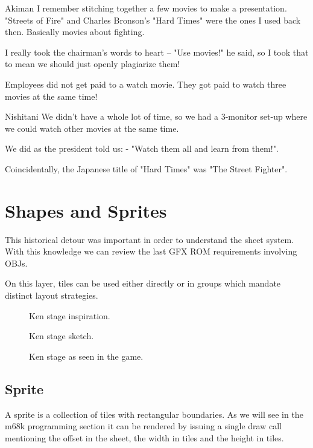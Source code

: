 \begin{q}{Akiman\cite{ffdevinterview}}
I remember stitching together a few movies to make a presentation. "Streets of Fire" and Charles Bronson’s "Hard Times" were the ones I used back then. Basically movies about fighting. 

I really took the chairman’s words to heart – "Use movies!" he said, so I took that to mean we should just openly plagiarize them!
\end{q}

Employees did not get paid to a watch movie. They got paid to watch three movies at the same time!

\begin{q}{Nishitani\cite{ffdevinterview}}
We didn't have a whole lot of time, so we had a 3-monitor set-up where we could watch other movies at the same time.

We did as the president told us: - "Watch them all and learn from them!".
\end{q}

\begin{trivia}
Coincidentally, the Japanese title of "Hard Times" was "The Street Fighter".
\end{trivia}


\section{Shapes and Sprites}
This historical detour was important in order to understand the sheet system. With this knowledge we can review the last GFX ROM requirements involving OBJs.  

On this layer, tiles can be used either directly or in groups which mandate distinct layout strategies.

\begin{figure}[H]
\caption*{Ken stage inspiration.}
\end{figure}

\begin{figure}[H]
\caption*{Ken stage sketch\cite{sf2completefiles}.}
\end{figure}

\begin{figure}[H]
\caption*{Ken stage as seen in the game.}
\end{figure}


\subsection{Sprite}
A sprite is a collection of tiles with rectangular boundaries. As we will see in the m68k programming section it can be rendered by issuing a single draw call mentioning the offset in the sheet, the width in tiles and the height in tiles.

